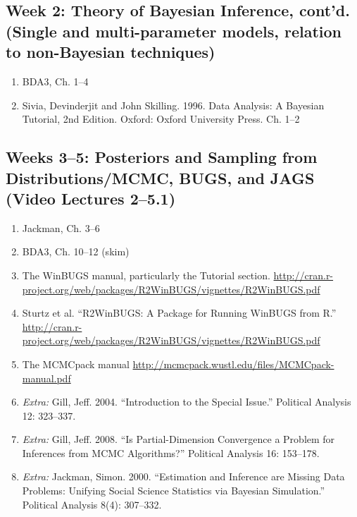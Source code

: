 \documentclass[11pt, leqno, fleqn]{article}
\begin{document}
\subsection*{Week 2: Theory of Bayesian Inference, cont'd. (Single and multi-parameter models, relation to non-Bayesian techniques)}
	\begin{enumerate}
	\item[] BDA3, Ch. 1--4
	\item[] Sivia, Devinderjit and John Skilling. 1996. Data Analysis: A Bayesian Tutorial, 2nd Edition. Oxford: Oxford University Press. Ch. 1--2
	\end{enumerate}
\subsection*{Weeks 3--5: Posteriors and Sampling from Distributions/MCMC, BUGS, and JAGS (Video Lectures 2--5.1)} 
	\begin{enumerate}
	\item[] Jackman, Ch. 3--6
	\item[] BDA3, Ch. 10--12 (skim)
	\item[] The WinBUGS manual, particularly the Tutorial section. \url{http://cran.r-
project.org/web/packages/R2WinBUGS/vignettes/R2WinBUGS.pdf}
	\item[] Sturtz et al. ``R2WinBUGS: A Package for Running WinBUGS from R.'' \url{http://cran.r-project.org/web/packages/R2WinBUGS/vignettes/R2WinBUGS.pdf}
	\item[] The MCMCpack manual \url{http://mcmcpack.wustl.edu/files/MCMCpack-manual.pdf}
	\item[] {\em Extra:} Gill, Jeff. 2004. ``Introduction to the Special Issue.'' Political Analysis 12: 323--337.
	\item[] {\em Extra:} Gill, Jeff. 2008. ``Is Partial-Dimension Convergence a Problem for Inferences from MCMC Algorithms?'' Political Analysis 16: 153--178.
	\item[] {\em Extra:} Jackman, Simon. 2000. ``Estimation and Inference are Missing Data Problems: Unifying Social Science Statistics via Bayesian Simulation.'' Political Analysis 8(4): 307--332.
	\end{enumerate}
\end{document}
